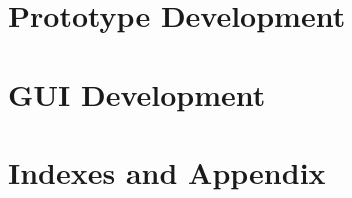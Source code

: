 \documentclass{thesis}
\begin{document}






\renewcommand{\baselinestretch}{0.8}
\tableofcontents
\renewcommand{\baselinestretch}{1.2}

\normalsize


\printnomenclature
{}

\begin{sloppypar}

    

    \part{Prototype Development}
    
    
    
    
    

    \part{GUI Development}
    \setcounter{chapter}{0}
    

    \part{Indexes and Appendix}
    \listoffigures

    \listoftables

    
    

    \appendix
    



\end{sloppypar}
\end{document}
